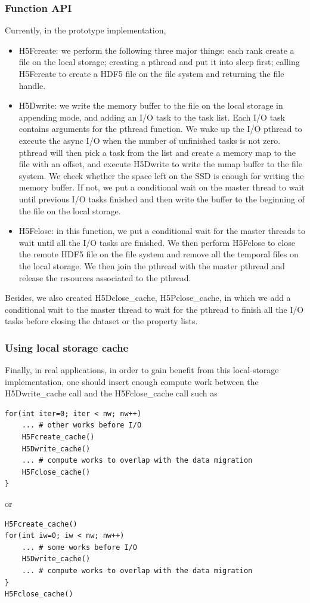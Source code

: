 \documentclass[aps, rmp, 11pt, notitlepage]{revtex4-1}
\begin{document}
\subsubsection{Function API}
Currently, in the prototype implementation, 
\begin{itemize}
\item H5Fcreate: we perform the following three major things: each rank create a file on the local storage; creating a pthread and put it into sleep first; calling H5Fcreate to create a HDF5 file on the file system and returning the file handle. 
\item H5Dwrite: we write the memory buffer to the file on the local storage in appending mode, and adding an I/O task to the task list. Each I/O task contains arguments for the pthread function. We wake up the I/O pthread to execute the async I/O when the number of unfinished tasks is not zero. pthread will then pick a task from the list and create a memory map to the file with an offset, and execute H5Dwrite to write the mmap buffer to the file system. We check whether the space left on the SSD is enough for writing the memory buffer. If not, we put a conditional wait on the master thread to wait until previous I/O tasks finished and then write the buffer to the beginning of the file on the local storage. 
\item H5Fclose: in this function, we put a conditional wait for the master threads to wait until all the I/O tasks are finished. We then perform H5Fclose to close the remote HDF5 file on the file system and remove all the temporal files on the local storage. We then join the pthread with the master pthread and release the resources associated to the pthread. 
\end{itemize}
Besides, we also created H5Dclose\_cache, H5Pclose\_cache, in which we add a conditional wait to the master thread to wait for the pthread to finish all the I/O tasks before closing the dataset or the property lists. 

\subsubsection{Using local storage cache}
Finally, in real applications, in order to gain benefit from this local-storage implementation,  one should insert enough compute work between the H5Dwrite\_cache call and the H5Fclose\_cache call such as 
\begin{lstlisting}
for(int iter=0; iter < nw; nw++)
	... # other works before I/O
	H5Fcreate_cache()
	H5Dwrite_cache()
	... # compute works to overlap with the data migration
	H5Fclose_cache()
}
\end{lstlisting}
or 
\begin{lstlisting}
H5Fcreate_cache()
for(int iw=0; iw < nw; nw++)
	... # some works before I/O
	H5Dwrite_cache()
	... # compute works to overlap with the data migration
}
H5Fclose_cache()
\end{lstlisting}
\end{document}
